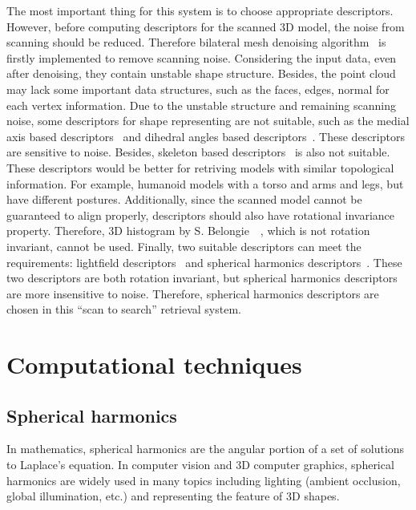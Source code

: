 The most important thing for this system is to choose appropriate descriptors. However, before computing descriptors for the scanned 3D model, the noise from scanning should be reduced. Therefore bilateral mesh denoising algorithm~\cite{fleishman2003bilateral} is firstly implemented to remove scanning noise. Considering the input data, even after denoising, they contain unstable shape structure. Besides, the point cloud may lack some important data structures, such as the faces, edges, normal for each vertex information. Due to the unstable structure and remaining scanning noise, some descriptors for shape representing are not suitable, such as the medial axis based descriptors~\cite{kim2001graph} and dihedral angles based descriptors~\cite{gal2009iwires}. These descriptors are sensitive to noise. Besides, skeleton based descriptors~\cite{sundar2003skeleton} is also not suitable. These descriptors would be better for retriving models with similar topological information. For example, humanoid models with a torso and arms and legs, but have different postures. Additionally, since the scanned model cannot be guaranteed to align properly, descriptors should also have rotational invariance property. Therefore, 3D histogram by S. Belongie~\etal~\cite{belongie2002shape}, which is not rotation invariant, cannot be used. Finally, two suitable descriptors can meet the requirements: lightfield descriptors~\cite{shen20033d} and spherical harmonics descriptors~\cite{Funkhouser:2003:SEM:588272.588279}. These two descriptors are both rotation invariant, but spherical harmonics descriptors are more insensitive to noise. Therefore, spherical harmonics descriptors are chosen in this ``scan to search'' retrieval system. 

\section{Computational techniques}
\label{computational_techniques}

\subsection{Spherical harmonics}

In mathematics, spherical harmonics are the angular portion of a set of solutions to Laplace's equation. In computer vision and 3D computer graphics, spherical harmonics are widely used in many topics including lighting (ambient occlusion, global illumination, etc.) and representing the feature of 3D shapes.

